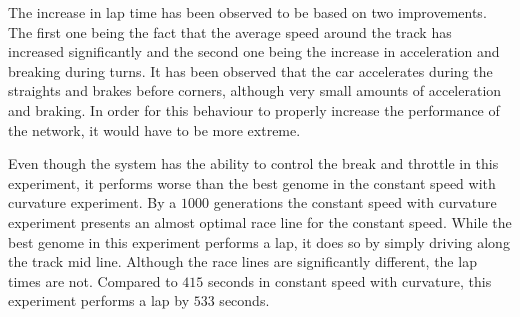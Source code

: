 The increase in lap time has been observed to be based on two improvements. The first one being the fact that the average speed around the track has increased significantly and the second one being the increase in acceleration and breaking during turns. It has been observed that the car accelerates during the straights and brakes before corners, although very small amounts of acceleration and braking. In order for this behaviour to properly increase the performance of the network, it would have to be more extreme.


Even though the system has the ability to control the break and throttle in this experiment, it performs worse than the best genome in the constant speed with curvature experiment. By a $1000$ generations the constant speed with curvature experiment presents an almost optimal race line for the constant speed. While the best genome in this experiment performs a lap, it does so by simply driving along the track mid line. Although the race lines are significantly different, the lap times are not. Compared to $415$ seconds in constant speed with curvature, this experiment performs a lap by $533$ seconds.

